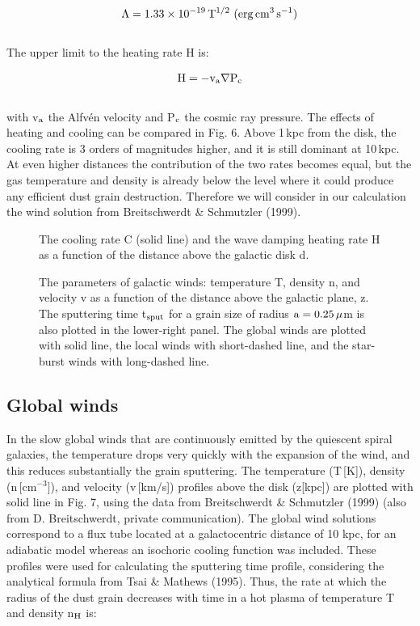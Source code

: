 \documentclass[]{aa}
\begin{document}
\begin{eqnarray}
\Lambda = 1.33\times 10^{-19}\,{\rm T}^{1/2} 
\,\,({\rm erg}\,{\rm cm}^3\,{\rm s}^{-1})
\end{eqnarray}
\\
The upper limit to the heating rate H is:

\begin{eqnarray}
{\rm H} = - {\rm v}_{\rm a} \nabla{\rm P}_{\rm c}
\end{eqnarray}
\\
with v$_{\rm a}$ the Alfv\'en velocity and P$_{\rm c}$ the cosmic ray pressure.
The effects of heating and cooling can be compared in Fig. 6. Above 1\,kpc 
from the disk, the cooling
rate is 3 orders of magnitudes higher, and it is still dominant at 10\,kpc. At
even higher distances the contribution of the two rates becomes equal, but the
gas temperature and density is already below the level where it could
produce any efficient dust grain destruction. Therefore we will consider in our
calculation the wind solution from Breitschwerdt \& Schmutzler (1999).

\begin{figure}[hbt]
\caption[]{The cooling rate C (solid line) and the wave damping
heating rate H as a function of the distance above the galactic disk d.}
\end{figure}

\begin{figure*}[hbt]
\caption[]{The parameters of galactic winds: temperature T, density n, and
velocity v as a function of the distance above the galactic plane, z. The
sputtering time t$_{\rm sput}$ for a grain size of radius 
${\rm a}=0.25\,{\mu}$m is
also plotted in the lower-right panel. The global winds
are plotted with solid line, the local winds with short-dashed line, and the 
star-burst winds with long-dashed line.}
\end{figure*}


\subsection{Global winds}


In the slow global winds that are continuously emitted by the quiescent spiral
galaxies, the temperature drops very quickly with the expansion of the wind,
and this reduces substantially the grain sputtering.
The temperature (T\,[K]), density (n\,[cm$^{-3}]$), and velocity (v\,[km/s]) 
profiles above the disk (z[kpc]) are
plotted with solid line in Fig. 7, using the data from Breitschwerdt \& 
Schmutzler (1999) (also from D. Breitschwerdt, private communication). 
The global 
wind solutions correspond to a flux tube located at a galactocentric 
distance of 10 kpc, for an adiabatic model whereas an isochoric cooling 
function was included. These profiles were used for calculating the 
sputtering time profile, considering the analytical formula from Tsai \&
Mathews (1995). Thus, the rate at which the 
radius of the
dust grain decreases with time in a hot plasma of temperature T and density
n$_{\rm H}$ is:
\end{document}
